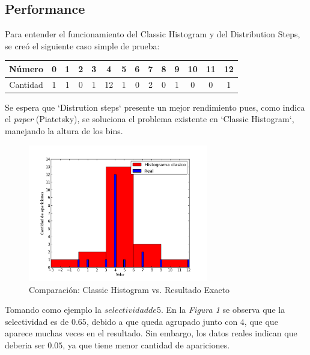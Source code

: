 \documentclass[10pt, a4paper,english,spanish,hidelinks]{article}
\begin{document}
\subsection{Performance}
Para entender el funcionamiento del Classic Histogram y del Distribution Steps, se creó el siguiente caso simple de prueba:

\begin{table}[htdp]
  \begin{center}
    \begin{tabular}{|c|c|c|c|c|c|c|c|c|c|c|c|c|c|} \hline
       Número  & 0 & 1 & 2 & 3 & 4 & 5 & 6 & 7 & 8 & 9 & 10 & 11 & 12 \\ \hline
       Cantidad & 1 & 1 & 0 & 1 & 12 & 1 & 0 & 2 & 0 & 1 & 0 & 0 & 1 \\ \hline
    \end{tabular}
  \end{center}
\end{table}


Se espera que `Distrution steps` presente un mejor rendimiento pues, como indica el \textit{paper} (Piatetsky),
se soluciona el problema existente en `Classic Histogram`, manejando la altura
de los bins.

\begin{figure}[h!]
  \centering
  \includegraphics[width=0.7\textwidth]{./imagenes/ejb1_ejemplo_classic_y_real.png}
  \caption{Comparación: Classic Histogram vs. Resultado Exacto}
\end{figure}


Tomando como ejemplo la $selectividad de 5$.
En la \textit{Figura 1} se observa que la selectividad es de $0.65$, debido a que queda agrupado junto
con $4$, que que aparece muchas veces en el resultado. Sin embargo, los datos reales indican que deberia ser $0.05$, ya que tiene menor cantidad de apariciones.
\end{document}
